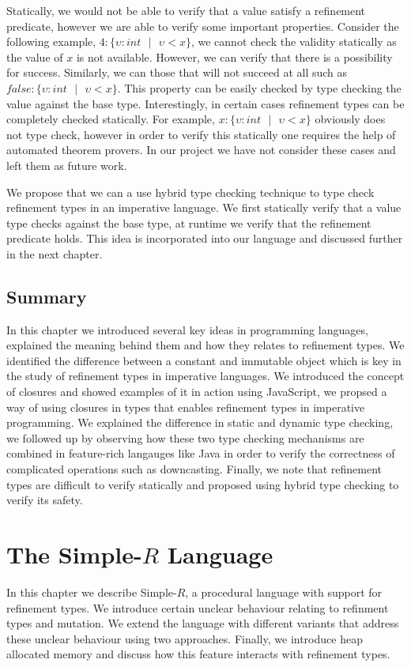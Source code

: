\documentclass[a4paper,12pt]{report}
\begin{document}
\par
Statically, we would not be able to verify that a value satisfy a refinement 
predicate, however we are able to verify some important properties. Consider the 
following example, $4 : \{\upsilon : int\text{ }|\text{ }\upsilon < x\}$, we 
cannot check the validity statically as the value of $x$ is not available. 
However, we can verify that there is a possibility for success. Similarly, we 
can those that will not succeed at all such as 
$\textit{false} : \{\upsilon : int\text{ }|\text{ }\upsilon < x\}$. This 
property can be easily checked by type checking the value against the base type. 
Interestingly, in certain cases refinement types can be completely checked 
statically. For example, $x : \{\upsilon : int\text{ }|\text{ }\upsilon < x\}$ 
obviously does not type check, however in order to verify this statically one 
requires the help of automated theorem provers. In our project we have not 
consider these cases and left them as future work. 

\par
We propose that we can a use hybrid type checking technique to type check 
refinement types in an imperative language. We first statically verify that 
a value type checks against the base type, at runtime we verify that the 
refinement predicate holds. This idea is incorporated into our language 
and discussed further in the next chapter. 

\section{Summary}
In this chapter we introduced several key ideas in programming languages, 
explained the meaning behind them and how they relates to refinement types. 
We identified the difference between a constant and 
immutable object which is key in the study of refinement types in 
imperative languages. We introduced the concept of closures and showed examples 
of it in action using JavaScript, we propsed a way of using closures 
in types that enables refinement types in imperative programming. 
We explained the difference in static 
and dynamic type checking, we followed up by observing how these two type 
checking mechanisms are combined in feature-rich langauges like Java in order to 
verify the correctness of complicated operations such as downcasting. Finally, 
we note that refinement types are difficult to verify statically and proposed 
using hybrid type checking to verify its safety. 

\chapter{The Simple-$R$ Language} \label{chapter:simple_r}
In this chapter we describe Simple-$R$, a procedural language 
with support for refinement types. We introduce certain unclear behaviour 
relating to refinment types and mutation. We extend the language with different 
variants that address these unclear behaviour using two approaches. Finally, 
we introduce heap allocated memory and discuss how this feature interacts 
with refinement types. 
\end{document}
